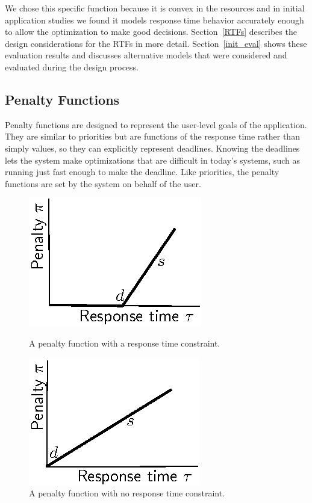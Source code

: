 We chose this specific function because it is convex in the resources and in initial application studies
we found it models response time behavior accurately enough to allow the optimization to make good decisions. Section~\ref{RTFs} describes the design considerations for the RTFs in more detail. Section~\ref{init_eval} shows these evaluation results and discusses alternative models that were considered and evaluated during the design process.

\subsection{Penalty Functions}

Penalty functions are designed to represent the user-level goals of
the application. They are similar to priorities but are functions of
the response time rather than simply values, so they can explicitly
represent deadlines.  Knowing the deadlines lets the system make
optimizations that are difficult in today's systems, such as running
just fast enough to make the deadline. Like priorities, the penalty
functions are set by the system on behalf of the user.


\begin{figure}[hb]
\parbox{3in}{
\includegraphics*[width=.45\columnwidth]{Figures/Penalty1.eps}
\caption{\label{f:pen1}A penalty function with a response time constraint.}
}
\hspace{\fill}
\parbox{3in}{
\includegraphics*[width=.45\columnwidth]{Figures/Penalty2.eps}
\caption{\label{f:pen2}A penalty function with no response time constraint.}
}
\end{figure}

